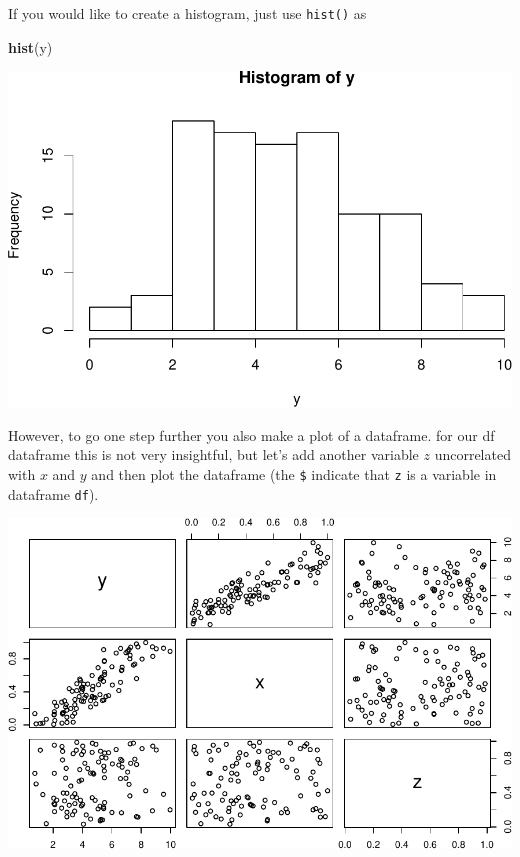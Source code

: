 \documentclass[]{article}
\newenvironment{Shaded}{\begin{snugshade}}{\end{snugshade}}
\newcommand{\KeywordTok}[1]{\textcolor[rgb]{0.13,0.29,0.53}{\textbf{#1}}}
\newcommand{\DecValTok}[1]{\textcolor[rgb]{0.00,0.00,0.81}{#1}}
\newcommand{\StringTok}[1]{\textcolor[rgb]{0.31,0.60,0.02}{#1}}
\newcommand{\OperatorTok}[1]{\textcolor[rgb]{0.81,0.36,0.00}{\textbf{#1}}}
\newcommand{\NormalTok}[1]{#1}
\theoremstyle{definition}
\theoremstyle{definition}
\theoremstyle{definition}
\theoremstyle{remark}
\begin{document}
If you would like to create a histogram, just use \texttt{hist()} as

\begin{Shaded}
\begin{Highlighting}[]
\KeywordTok{hist}\NormalTok{(y)}
\end{Highlighting}
\end{Shaded}

\includegraphics{./unnamed-chunk-28-1.pdf}

However, to go one step further you also make a plot of a dataframe. for
our df dataframe this is not very insightful, but let's add another
variable \(z\) uncorrelated with \(x\) and \(y\) and then plot the
dataframe (the \texttt{\$} indicate that \texttt{z} is a variable in
dataframe \texttt{df}).

\begin{Shaded}
\end{Shaded}

\includegraphics{./unnamed-chunk-29-1.pdf}
\end{document}

